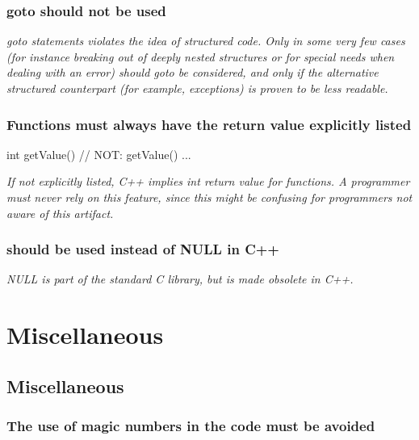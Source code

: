 \documentclass[a4paper,11pt,oneside]{scrbook}
\newcommand{\guideline}[1]{{\subsection{#1}}}
\newcommand{\motivation}[1]{{\normalfont \itshape #1}}
\newcommand{\trcode}[1]{{\normalfont \ttfamily #1}}
\begin{document}
\guideline{\trcode{goto} should not be used}

\motivation{ \trcode{goto} statements violates the idea of structured
  code. Only in some very few cases (for instance breaking out of
  deeply nested structures or for special needs when dealing with an
  error) should \trcode{goto} be considered, and only if the
  alternative structured counterpart (for example, exceptions) is
  proven to be less readable.
}

\guideline{Functions must always have the return value explicitly listed}

\begin{code}
 int getValue() { // NOT: getValue()
   ...
 }
\end{code}

\motivation{
  If not explicitly listed, C++ implies int return value for functions. A
  programmer must never rely on this feature, since this might be
  confusing for programmers not aware of this artifact.
}

\guideline{\trcode{0} should be used instead of \trcode{NULL} in C++}

\motivation{
  NULL is part of the standard C library, but is made obsolete in C++. 
}

\chapter{Miscellaneous}

\section{Miscellaneous}

\guideline{The use of magic numbers in the code must be avoided}
\end{document}

